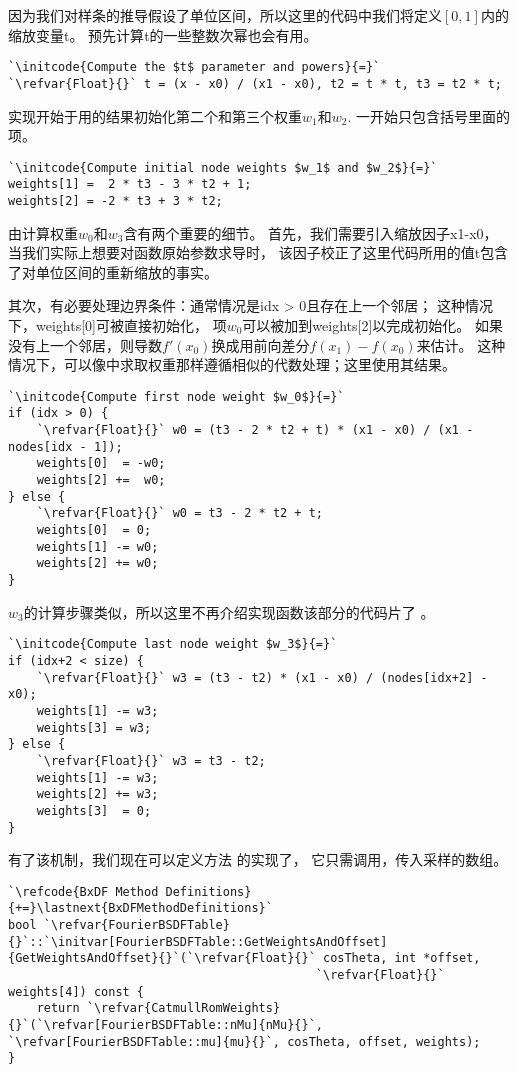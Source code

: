 因为我们对样条的推导假设了单位区间，所以这里的代码中我们将定义$[0,1]$内的缩放变量{\ttfamily t}。
预先计算{\ttfamily t}的一些整数次幂也会有用。
\begin{lstlisting}
`\initcode{Compute the $t$ parameter and powers}{=}`
`\refvar{Float}{}` t = (x - x0) / (x1 - x0), t2 = t * t, t3 = t2 * t;
\end{lstlisting}
实现开始于用的结果初始化第二个和第三个权重$w_1$和$w_2$.
一开始只包含括号里面的项。
\begin{lstlisting}
`\initcode{Compute initial node weights $w_1$ and $w_2$}{=}`
weights[1] =  2 * t3 - 3 * t2 + 1;
weights[2] = -2 * t3 + 3 * t2;
\end{lstlisting}

由计算权重$w_0$和$w_3$含有两个重要的细节。
首先，我们需要引入缩放因子{\ttfamily x1-x0}，
当我们实际上想要对函数原始参数求导时，
该因子校正了这里代码所用的值{\ttfamily t}包含了对单位区间的重新缩放的事实。

其次，有必要处理边界条件：通常情况是{\ttfamily idx > 0}且存在上一个邻居；
这种情况下，{\ttfamily weights[0]}可被直接初始化，
项$w_0$可以被加到{\ttfamily weights[2]}以完成初始化。
如果没有上一个邻居，则导数$f'(x_0)$换成用前向差分$f(x_1)-f(x_0)$来估计。
这种情况下，可以像中求取权重那样遵循相似的代数处理；这里使用其结果。
\begin{lstlisting}
`\initcode{Compute first node weight $w_0$}{=}`
if (idx > 0) {
    `\refvar{Float}{}` w0 = (t3 - 2 * t2 + t) * (x1 - x0) / (x1 - nodes[idx - 1]);
    weights[0]  = -w0;
    weights[2] +=  w0;
} else {
    `\refvar{Float}{}` w0 = t3 - 2 * t2 + t;
    weights[0]  = 0;
    weights[1] -= w0;
    weights[2] += w0;
}
\end{lstlisting}

$w_3$的计算步骤类似，所以这里不再介绍实现函数该部分的代码片了
。
\begin{lstlisting}
`\initcode{Compute last node weight $w_3$}{=}`
if (idx+2 < size) {
    `\refvar{Float}{}` w3 = (t3 - t2) * (x1 - x0) / (nodes[idx+2] - x0);
    weights[1] -= w3;
    weights[3] = w3;
} else {
    `\refvar{Float}{}` w3 = t3 - t2;
    weights[1] -= w3;
    weights[2] += w3; 
    weights[3]  = 0;
}
\end{lstlisting}

有了该机制，我们现在可以定义方法
的实现了，
它只需调用，传入采样的数组。
\begin{lstlisting}
`\refcode{BxDF Method Definitions}{+=}\lastnext{BxDFMethodDefinitions}`
bool `\refvar{FourierBSDFTable}{}`::`\initvar[FourierBSDFTable::GetWeightsAndOffset]{GetWeightsAndOffset}{}`(`\refvar{Float}{}` cosTheta, int *offset,
                                           `\refvar{Float}{}` weights[4]) const {
    return `\refvar{CatmullRomWeights}{}`(`\refvar[FourierBSDFTable::nMu]{nMu}{}`, `\refvar[FourierBSDFTable::mu]{mu}{}`, cosTheta, offset, weights);
}
\end{lstlisting}
